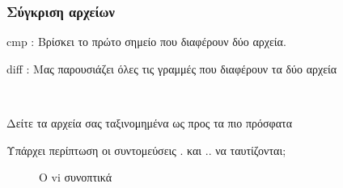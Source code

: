 \subsubsection{Σύγκριση αρχείων}

\begin{packed_item}
  \item cmp : Βρίσκει το πρώτο σημείο που διαφέρουν δύο αρχεία.
  \item diff : Μας παρουσιάζει όλες τις γραμμές που διαφέρουν τα δύο αρχεία
\end{packed_item}

‏
\begin{tcolorbox}[frogbox, title=Ασκήσεις]
\begin{packed_enum}
 \item Δείτε τα αρχεία σας ταξινομημένα ως προς τα πιο πρόσφατα 
 \item Υπάρχει περίπτωση οι συντομεύσεις . και .. να ταυτίζονται;
\end{packed_enum}
\end{tcolorbox}





\begin{figure}[!h]
  \centering
  \caption{Ο vi συνοπτικά}
\end{figure} 

